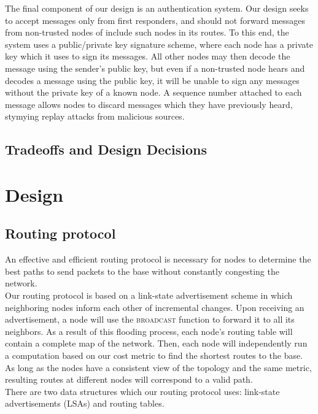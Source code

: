 \documentclass[letterpaper]{article}
\begin{document}
The final component of our design is an authentication system. Our design seeks to accept messages only from
first responders, and should not forward messages from non-trusted nodes of include such nodes in its
routes. To this end, the system uses a public/private key signature scheme, where each node has a private
key which it uses to sign its messages. All other nodes may then decode the message using the sender's
public key, but even if a non-trusted node hears and decodes a message using the public key, it will be 
unable to sign any messages without the private key of a known node. A sequence number attached to each
message allows nodes to discard messages which they have previously heard, stymying replay attacks from
malicious sources.


\subsection{Tradeoffs and Design Decisions}

\section{Design}

\subsection{Routing protocol}

An effective and efficient routing protocol is necessary for nodes to determine the best paths to send
packets to the base without constantly congesting the network.
\\

\noindent Our routing protocol is based on a link-state advertisement scheme in which neighboring nodes 
inform each other of incremental changes. Upon receiving an advertisement, a node will use the 
\textsc{broadcast} function to forward it to all its neighbors. As a result of this flooding process,
each node's routing table will contain a complete map of the network. Then, each node will independently
run a computation based on our cost metric to find the shortest routes to the base. As long as the nodes
have a consistent view of the topology and the same metric, resulting routes at different nodes will
correspond to a valid path.
\\

\noindent There are two data structures which our routing protocol uses: link-state advertisements (LSAs)
and routing tables. 
\\
\end{document}
